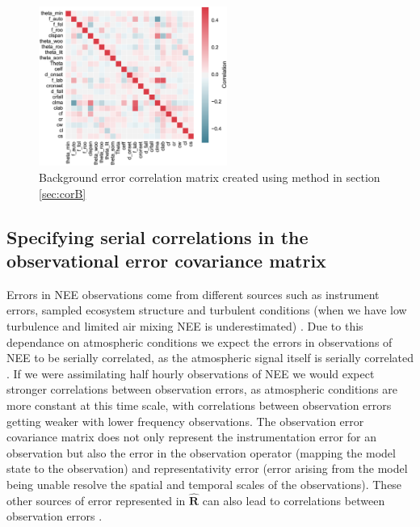 \documentclass[11pt]{article}
\begin{document}
\begin{figure}[ht]
    \centering
    \includegraphics[width=0.55\textwidth]{bedccor.eps}
    \caption{Background error correlation matrix created using method in section \ref{sec:corB}}
    \label{fig:Bcorr}
\end{figure}

\subsection{Specifying serial correlations in the observational error covariance matrix} \label{sec:corR}

Errors in NEE observations come from different sources such as instrument errors, sampled ecosystem structure and turbulent conditions (when we have low turbulence and limited air mixing NEE is underestimated) \citep{Papale2006}. Due to this dependance on atmospheric conditions we expect the errors in observations of NEE to be serially correlated, as the atmospheric signal itself is serially correlated \citep{Daley1992}. If we were assimilating half hourly observations of NEE we would expect stronger correlations between observation errors, as atmospheric conditions are more constant at this time scale, with correlations between observation errors getting weaker with lower frequency observations. The observation error covariance matrix does not only represent the instrumentation error for an observation but also the error in the observation operator (mapping the model state to the observation) and representativity error (error arising from the model being unable resolve the spatial and temporal scales of the observations). These other sources of error represented in $\hat{\textbf{R}}$ can also lead to correlations between observation errors \citep{Waller2014}.   
\end{document}
